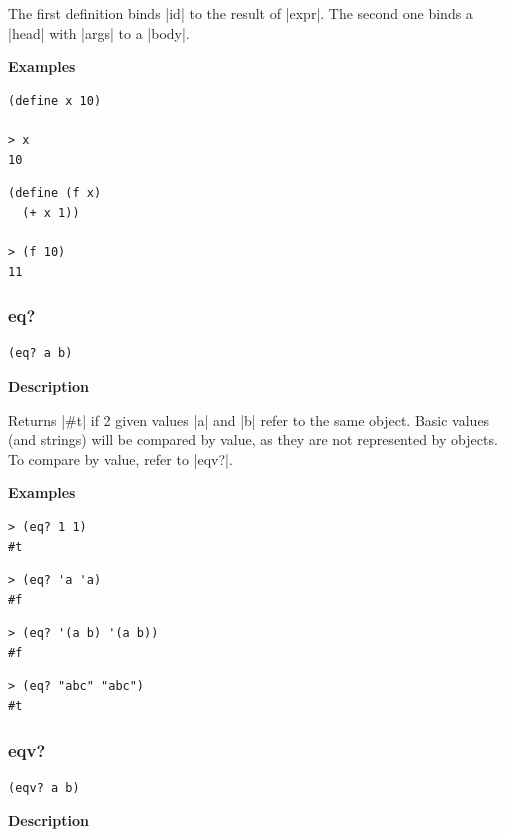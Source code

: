\documentclass[a4paper]{article}
\begin{document}
The first definition binds |id| to the result of |expr|. The second one binds a |head| with |args| to a |body|.

\textbf{Examples}

\begin{lstlisting}
(define x 10)

> x
10
\end{lstlisting}

\begin{lstlisting}
(define (f x)
  (+ x 1))
  
> (f 10)
11
\end{lstlisting}


\subsubsection{eq?}

\begin{lstlisting}[frame=none]
(eq? a b)
\end{lstlisting}

\textbf{Description}

Returns |#t| if 2 given values |a| and |b| refer to the same object. Basic values (and strings) will be compared by value, as they are not represented by objects. To compare by value, refer to |eqv?|.

\textbf{Examples}

\begin{lstlisting}
> (eq? 1 1)
#t
\end{lstlisting}

\begin{lstlisting}
> (eq? 'a 'a)
#f
\end{lstlisting}

\begin{lstlisting}
> (eq? '(a b) '(a b))
#f
\end{lstlisting}

\begin{lstlisting}
> (eq? "abc" "abc")
#t
\end{lstlisting}


\subsubsection{eqv?}

\begin{lstlisting}[frame=none]
(eqv? a b)
\end{lstlisting}

\textbf{Description}
\end{document}
